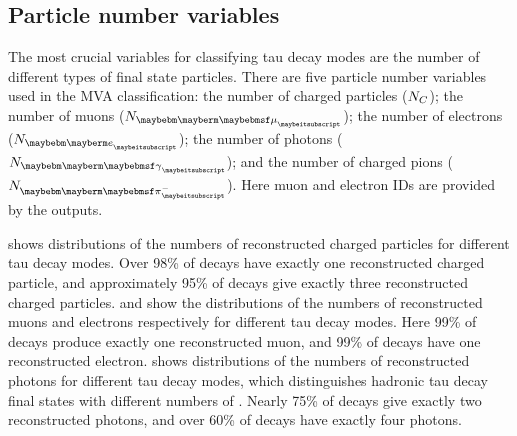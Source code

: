 \subsection{Particle number variables}

The most crucial variables for classifying tau decay modes  are the number of different types of final state particles. There are five particle number  variables used in the MVA classification: the number of charged particles (${N}_{C}$); the number of muons (${N}_{\Pmu}$); the number of electrons (${N}_{\Pe}$); the number of photons (${N}_{\Pgg}$); and the number of charged pions (${N}_{\Pgpm}$). Here muon and electron IDs are provided by the \pandora outputs.


 shows  distributions of the numbers of reconstructed charged particles for different tau decay modes. Over 98\% of   \tauToPion decays have exactly one reconstructed charged particle, and approximately 95\% of \decayAiPionShort decays give exactly three reconstructed charged particles.  and   show the distributions of the numbers of reconstructed muons and electrons respectively for different tau decay modes. Here 99\% of \tauToMuon decays produce exactly one reconstructed muon, and 99\% of \tauToElectron decays have one reconstructed electron.  shows  distributions of the numbers of reconstructed photons  for different tau decay modes, which distinguishes hadronic tau decay final states with different numbers of \Ppizero.  Nearly 75\% of  \decayRhoShort  decays give exactly two reconstructed photons, and over 60\% of \decayAiPhotonShort decays have exactly four photons.




